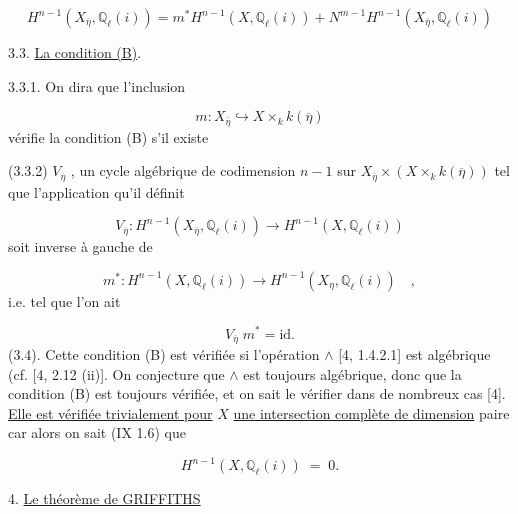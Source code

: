 \begin{equation*}
H^{n-1}(X_{\bar{\eta}},\mathbb{Q}_{\ell}(i)) = m^{*}H^{n-1}(X,\mathbb{Q}_{\ell}(i)) + N^{m-1}H^{n-1}(X_{\bar{\eta}},\mathbb{Q}_{\ell}(i))
\end{equation*}



3.3. \underline{La condition (B)}.

3.3.1. On dira que l'inclusion

\begin{equation*}
m : X_{\overline{\eta}} \hookrightarrow X \times_{k} k(\overline{\eta})
\end{equation*}
vérifie la condition (B)  s'il existe

(3.3.2) $V_{\overline{\eta}}$ , un cycle algébrique de codimension $n-1$ sur $X_{\overline{\eta}} \times (X \times_{k} k(\overline{\eta}))$ tel que l'application qu'il définit

\begin{equation}\tag{3.3.3}
V_{\overline{\eta}} : H^{n-1}(X_{\overline{\eta}},\mathbb{Q}_{\ell}(i)) \longrightarrow H^{n-1}(X,\mathbb{Q}_{\ell}(i))
\end{equation}
soit inverse à gauche de

\begin{equation}\tag{3.3.4}
m^* : H^{n-1}(X,\mathbb{Q}_{\ell}(i)) \longrightarrow H^{n-1}(X_{\eta},\mathbb{Q}_{\ell}(i)) \quad ,
\end{equation}
i.e. tel que l'on ait

\begin{equation}\tag{3.3.5}
V_{\overline{\eta}} \; m^* = \mathrm{id} .
\end{equation}
(3.4). Cette condition (B) est vérifiée si l'opération $\wedge$ [4, 1.4.2.1] est algébrique (cf. [4, 2.12 (ii)]. On conjecture que $\wedge$ est toujours algébrique, donc que la condition (B) est toujours vérifiée, et on sait le vérifier dans de nombreux cas [4]. \underline{Elle est vérifiée trivialement pour} $X$ \underline{une intersection complète de dimension} paire car alors on sait (IX 1.6) que

\begin{equation}\tag{3.4.1}
H^{n-1}(X,\mathbb{Q}_{\ell}(i)) \;=\; 0 .
\end{equation}



4. \underline{Le théorème de GRIFFITHS}

